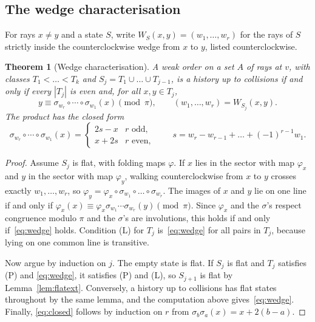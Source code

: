 \documentclass[11pt]{article}
\newtheorem{theorem}{Theorem}
\theoremstyle{definition}
\theoremstyle{remark}
\begin{document}
\subsection{The wedge characterisation}

For rays $x\neq y$ and a state $S$, write $W_S(x,y)=(w_1,\dots,w_r)$ for the rays of $S$ strictly inside the counterclockwise wedge from $x$ to $y$, listed counterclockwise.

\begin{theorem}[Wedge characterisation]\label{thm:wedge}
A weak order on a set $A$ of rays at $v$, with classes $T_1<\dots<T_k$ and $S_j=T_1\cup\dots\cup T_{j-1}$, is a history up to collisions if and only if every $|T_j|$ is even and, for all $x,y\in T_j$,
\begin{equation}\label{eq:wedge}
y\equiv\sigma_{w_r}\circ\cdots\circ\sigma_{w_1}(x)\pmod\pi,\qquad (w_1,\dots,w_r)=W_{S_j}(x,y).
\end{equation}
The product has the closed form
\begin{equation}\label{eq:closed}
\sigma_{w_r}\circ\cdots\circ\sigma_{w_1}(x)=\begin{cases}2s-x & r\text{ odd},\\ x+2s & r\text{ even},\end{cases}\qquad s=w_r-w_{r-1}+\dots+(-1)^{r-1}w_1.
\end{equation}
\end{theorem}

\begin{proof}
Assume $S_j$ is flat, with folding maps $\varphi$. If $x$ lies in the sector with map $\varphi_x$ and $y$ in the sector with map $\varphi_y$, walking counterclockwise from $x$ to $y$ crosses exactly $w_1,\dots,w_r$, so $\varphi_y=\varphi_x\circ\sigma_{w_1}\circ\dots\circ\sigma_{w_r}$. The images of $x$ and $y$ lie on one line if and only if $\varphi_x(x)\equiv\varphi_x\sigma_{w_1}\cdots\sigma_{w_r}(y)\pmod\pi$. Since $\varphi_x$ and the $\sigma$'s respect congruence modulo $\pi$ and the $\sigma$'s are involutions, this holds if and only if~\eqref{eq:wedge} holds. Condition (L) for $T_j$ is~\eqref{eq:wedge} for all pairs in $T_j$, because lying on one common line is transitive.

Now argue by induction on $j$. The empty state is flat. If $S_j$ is flat and $T_j$ satisfies (P) and \eqref{eq:wedge}, it satisfies (P) and (L), so $S_{j+1}$ is flat by Lemma~\ref{lem:flatext}. Conversely, a history up to collisions has flat states throughout by the same lemma, and the computation above gives~\eqref{eq:wedge}. Finally, \eqref{eq:closed} follows by induction on $r$ from $\sigma_b\sigma_a(x)=x+2(b-a)$.
\end{proof}
\end{document}
